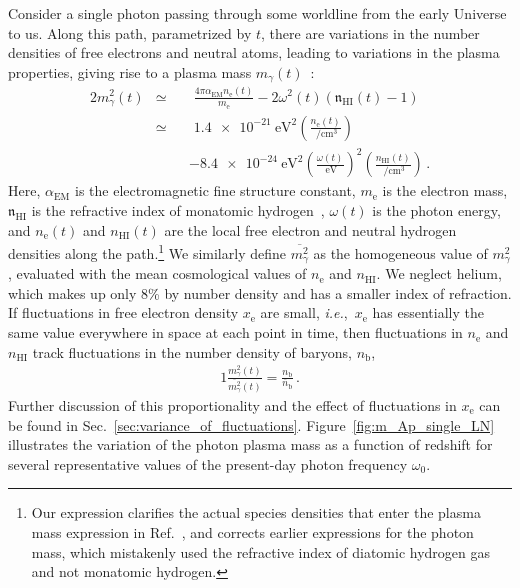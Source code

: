 \documentclass[prd,aps,10pt,nofootinbib,twocolumn,superscriptaddress,preprintnumbers,balancelastpage,longbibliography]{revtex4-1}
\begin{document}
Consider a single photon passing through some worldline from the early Universe to us.
Along this path, parametrized by $t$, there are variations in the number densities of free electrons and neutral atoms, leading to variations in the plasma properties, giving rise to a plasma mass $m_\gamma(t)$~\cite{Mirizzi:2009iz}:
%
\begin{alignat}{2}
    m_\gamma^2(t) &\simeq&& \,\, \frac{4 \pi \alpha_\text{EM} n_\text{e}(t)}{m_\text{e}} - 2 \omega^2(t) \left(\mathfrak{n}_\text{HI}(t) - 1 \right) \nonumber \\
    &\simeq&& \,\, \SI{1.4e-21}{\eV\squared} \left(\frac{n_\mathrm{e}(t)}{\SI{}{\per\centi\meter\cubed}}\right)  \nonumber \\
    & &&- \SI{8.4e-24}{\eV\squared} \left( \frac{\omega(t)}{\SI{}{\eV}} \right)^2 \left(\frac{n_{\mathrm{HI}}(t)}{\SI{}{\per\centi\meter\cubed}}\right)  \,.
    \label{eq:m_gamma_sq}
\end{alignat}
%
Here, $\alpha_\text{EM}$ is the electromagnetic fine structure constant, $m_\text{e}$ is the electron mass, $\mathfrak{n}_\text{HI}$ is the refractive index of monatomic hydrogen~\cite{pauling1985introduction}, $\omega(t)$ is the photon energy, and $n_\text{e}(t)$ and $n_\text{HI}(t)$ are the local free electron and neutral hydrogen densities along the path.\footnote{Our expression clarifies the actual species densities that enter the plasma mass expression in Ref.~\cite{Mirizzi:2009iz}, and corrects earlier expressions for the photon mass, which mistakenly used the refractive index of diatomic hydrogen gas and not monatomic hydrogen.}
We similarly define $\overline{m_\gamma^2}$ as the homogeneous value of $m_\gamma^2$, evaluated with the mean cosmological values of $n_\text{e}$ and $n_\text{HI}$. 
We neglect helium, which makes up only 8\% by number density and has a smaller index of refraction. 
If fluctuations in free electron density $x_\text{e}$ are small, \emph{i.e.},\ $x_\text{e}$ has essentially the same value everywhere in space at each point in time, then fluctuations in $n_\text{e}$ and $n_\text{HI}$ track fluctuations in the number density of baryons, $n_\text{b}$,
%
\begin{alignat}{1}
    \frac{m_\gamma^2(t)}{\overline{m_\gamma^2}(t)} = \frac{n_\text{b}}{\overline{n}_\text{b}} \,.
    \label{eq:m_gamma_sq_propto_n_b}
\end{alignat}
%
Further discussion of this proportionality and the effect of fluctuations in $x_\text{e}$ can be found in Sec.~\ref{sec:variance_of_fluctuations}. Figure~\ref{fig:m_Ap_single_LN} illustrates the variation of the photon plasma mass as a function of redshift for several representative values of the present-day photon frequency $\omega_0$.
\end{document}
